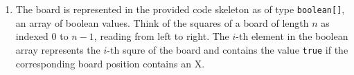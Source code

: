 \documentclass[10pt,a4paper]{article}
\begin{document}
\begin{enumerate}
\item The board is represented in the provided code skeleton as of type
  \texttt{boolean[]}, an array of boolean values. Think of the squares of a
  board of length $n$ as indexed $0$ to $n-1$, reading from left to right. The
  $i$-th element in the boolean array represents the $i$-th squre of the board
  and contains the value \texttt{true} if the corresponding board position
  contains an X.
 
\end{enumerate}
\end{document}

